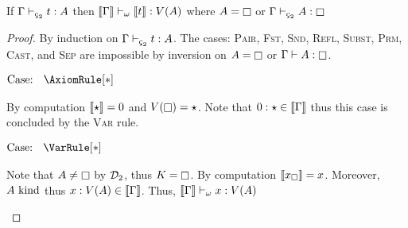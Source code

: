 \begin{theorem}
    \label{lem:3:soundness_of_sema}
    If $\Gamma \vdash_{\ced} t : A$ then $\llbracket \Gamma \rrbracket \vdash_\omega \llbracket t \rrbracket : V(A)$
    where $A = \kind$ or $\Gamma \vdash_{\ced} A : \kind$
\end{theorem}
\begin{proof}
    By induction on $\Gamma \vdash_{\ced} t : A$.
    The cases: \textsc{Pair}, \textsc{Fst}, \textsc{Snd}, \textsc{Refl}, \textsc{Subst}, \textsc{Prm}, \textsc{Cast}, and \textsc{Sep} are impossible by inversion on $A = \kind$ or $\Gamma \vdash A : \kind$.

    $\text{Case: }\begin{array}{c} \AxiomRule[*] \end{array}$
    \begin{proofcase}
        By computation $\llbracket \star \rrbracket = 0$ and $V(\kind) = \star$.
        Note that $0 : \star \in \llbracket \Gamma \rrbracket$ thus this case is concluded by the \textsc{Var} rule.
    \end{proofcase}

    $\text{Case: }\begin{array}{c} \VarRule[*] \end{array}$
    \begin{proofcase}
        Note that $A \neq \kind$ by $\mathcal{D}_{2}$, thus $K = \kind$.
        By computation $\llbracket x_\square \rrbracket = x$.
        Moreover, $A~\textnormal{kind}$ thus $x : V(A) \in \llbracket \Gamma \rrbracket$.
        Thus, $\llbracket \Gamma \rrbracket \vdash_\omega x : V(A)$
    \end{proofcase}


\end{proof}
